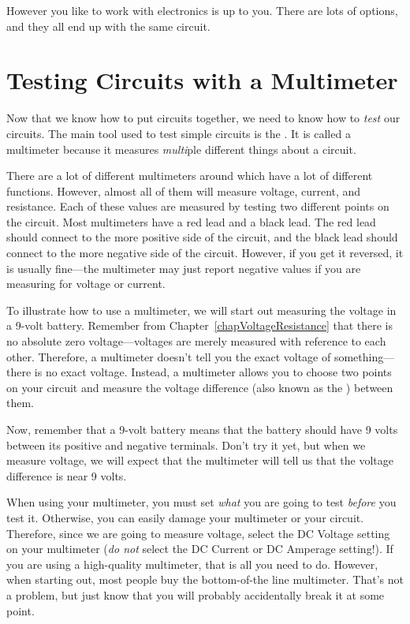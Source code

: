 However you like to work with electronics is up to you. 
There are lots of options, and they all end up with the same circuit.

\section{Testing Circuits with a Multimeter}

Now that we know how to put circuits together, we need to know how to \emph{test} our circuits.
The main tool used to test simple circuits is the .
It is called a multimeter because it measures \emph{multi}ple different things about a circuit.

There are a lot of different multimeters around which have a lot of different functions.
However, almost all of them will measure voltage, current, and resistance.
Each of these values are measured by testing two different points on the circuit.
Most multimeters have a red lead and a black lead.
The red lead should connect to the more positive side of the circuit, and the black lead should connect to the more negative side of the circuit.
However, if you get it reversed, it is usually fine---the multimeter may just report negative values if you are measuring for voltage or current.


To illustrate how to use a multimeter, we will start out measuring the voltage in a 9-volt battery.
Remember from Chapter~\ref{chapVoltageResistance} that there is no absolute zero voltage---voltages are merely measured with reference to each other.
Therefore, a multimeter doesn't tell you the exact voltage of something---there is no exact voltage.
Instead, a multimeter allows you to choose two points on your circuit and measure the voltage difference (also known as the ) between them.

Now, remember that a 9-volt battery means that the battery should have 9 volts between its positive and negative terminals.
Don't try it yet, but when we measure voltage, we will expect that the multimeter will tell us that the voltage difference is near 9 volts.

When using your multimeter, you must set \emph{what} you are going to test \emph{before} you test it.
Otherwise, you can easily damage your multimeter or your circuit.
Therefore, since we are going to measure voltage, select the DC Voltage setting on your multimeter (\emph{do not} select the DC Current or DC Amperage setting!).
If you are using a high-quality  multimeter, that is all you need to do.
However, when starting out, most people buy the bottom-of-the line multimeter.
That's not a problem, but just know that you will probably accidentally break it at some point.


